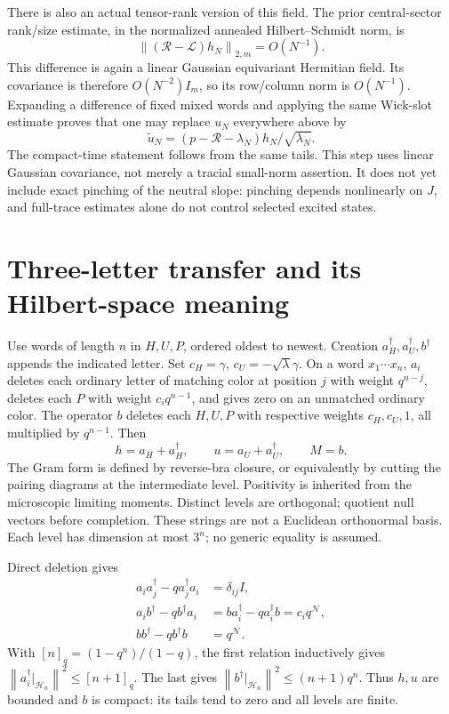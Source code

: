 \documentclass[11pt]{article}
\newcommand{\HH}{\mathcal H}
\newcommand{\norm}[1]{\left\lVert#1\right\rVert}
\newcommand{\NN}{\mathcal N}
\begin{document}
There is also an actual tensor-rank version of this field. The prior
central-sector rank/size estimate, in the normalized annealed
Hilbert--Schmidt norm, is
\begin{equation}
 \norm{(\mathcal R-\mathcal L)h_N}_{2,m}=O(N^{-1}).
\end{equation}
This difference is again a linear Gaussian equivariant Hermitian
field. Its covariance is therefore $O(N^{-2})I_m$, so its row/column
norm is $O(N^{-1})$. Expanding a difference of fixed mixed words and
applying the same Wick-slot estimate proves that one may replace
$u_N$ everywhere above by
\begin{equation}
 \widetilde u_N=(p-\mathcal R-\lambda_N)h_N/\sqrt{\lambda_N}.
\end{equation}
The compact-time statement follows from the same tails. This step uses
linear Gaussian covariance, not merely a tracial small-norm assertion.
It does not yet include exact pinching of the neutral slope: pinching
depends nonlinearly on $J$, and full-trace estimates alone do not
control selected excited states.

\newpage
\section{Three-letter transfer and its Hilbert-space meaning}
Use words of length $n$ in $H,U,P$, ordered oldest to newest. Creation
$a_H^\dagger,a_U^\dagger,b^\dagger$ appends the indicated letter. Set
$c_H=\gamma$, $c_U=-\sqrt\lambda\gamma$. On a word $x_1\cdots x_n$,
$a_i$ deletes each ordinary letter of matching color at position $j$
with weight $q^{n-j}$, deletes each $P$ with weight $c_iq^{n-1}$,
and gives zero on an unmatched ordinary color. The operator $b$ deletes
each $H,U,P$ with respective weights $c_H,c_U,1$, all multiplied by
$q^{n-1}$. Then
\begin{equation}
 h=a_H+a_H^\dagger,\qquad u=a_U+a_U^\dagger,\qquad M=b.
\end{equation}
The Gram form is defined by reverse-bra closure, or equivalently by
cutting the pairing diagrams at the intermediate level. Positivity is
inherited from the microscopic limiting moments. Distinct levels are
orthogonal; quotient null vectors before completion. These strings
are not a Euclidean orthonormal basis. Each level has dimension at
most $3^n$; no generic equality is assumed.

Direct deletion gives
\begin{align}\label{eq:alg}
 a_i a_j^\dagger-q a_j^\dagger a_i&=\delta_{ij}I,\\
 a_i b^\dagger-qb^\dagger a_i
   &=b a_i^\dagger-q a_i^\dagger b=c_i q^{\NN},\\
 bb^\dagger-qb^\dagger b&=q^{\NN}.\label{eq:compact}
\end{align}
With $[n]_q=(1-q^n)/(1-q)$, the first relation inductively gives
$\norm{a_i^\dagger|_{\HH_n}}^2\le[n+1]_q$. The last gives
$\norm{b^\dagger|_{\HH_n}}^2\le(n+1)q^n$. Thus $h,u$ are bounded
and $b$ is compact: its tails tend to zero and all levels are finite.
\end{document}
